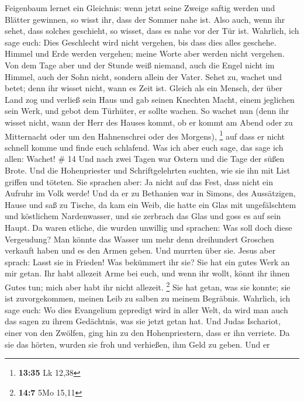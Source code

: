Feigenbaum lernet ein Gleichnis: wenn jetzt seine Zweige saftig werden
und Blätter gewinnen, so wisst ihr, dass der Sommer nahe ist.
 Also auch, wenn ihr sehet, dass solches geschieht, so
wisset, dass es nahe vor der Tür ist.  Wahrlich, ich sage
euch: Dies Geschlecht wird nicht vergehen, bis dass dies alles geschehe.
 Himmel und Erde werden vergehen; meine Worte aber werden
nicht vergehen.  Von dem Tage aber und der Stunde weiß
niemand, auch die Engel nicht im Himmel, auch der Sohn nicht, sondern
allein der Vater.  Sehet zu, wachet und betet; denn ihr
wisset nicht, wann es Zeit ist.  Gleich als ein Mensch, der
über Land zog und verließ sein Haus und gab seinen Knechten Macht, einem
jeglichen sein Werk, und gebot dem Türhüter, er sollte wachen.
 So wachet nun (denn ihr wisset nicht, wann der Herr des
Hauses kommt, ob er kommt am Abend oder zu Mitternacht oder um den
Hahnenschrei oder des Morgens), \footnote{\textbf{13:35} Lk 12,38}
 auf dass er nicht schnell komme und finde euch schlafend.
 Was ich aber euch sage, das sage ich allen: Wachet! \# 14
 Und nach zwei Tagen war Ostern und die Tage der süßen
Brote. Und die Hohenpriester und Schriftgelehrten suchten, wie sie ihn
mit List griffen und töteten.  Sie sprachen aber: Ja nicht
auf das Fest, dass nicht ein Aufruhr im Volk werde!  Und da
er zu Bethanien war in Simons, des Aussätzigen, Hause und saß zu Tische,
da kam ein Weib, die hatte ein Glas mit ungefälschtem und köstlichem
Nardenwasser, und sie zerbrach das Glas und goss es auf sein Haupt.
 Da waren etliche, die wurden unwillig und sprachen: Was
soll doch diese Vergeudung?  Man könnte das Wasser um mehr
denn dreihundert Groschen verkauft haben und es den Armen geben. Und
murrten über sie.  Jesus aber sprach: Lasst sie in Frieden!
Was bekümmert ihr sie? Sie hat ein gutes Werk an mir getan. 
Ihr habt allezeit Arme bei euch, und wenn ihr wollt, könnt ihr ihnen
Gutes tun; mich aber habt ihr nicht allezeit. \footnote{\textbf{14:7}
  5Mo 15,11}  Sie hat getan, was sie konnte; sie ist
zuvorgekommen, meinen Leib zu salben zu meinem Begräbnis. 
Wahrlich, ich sage euch: Wo dies Evangelium gepredigt wird in aller
Welt, da wird man auch das sagen zu ihrem Gedächtnis, was sie jetzt
getan hat.  Und Judas Ischariot, einer von den Zwölfen,
ging hin zu den Hohenpriestern, dass er ihn verriete.  Da
sie das hörten, wurden sie froh und verhießen, ihm Geld zu geben. Und er

